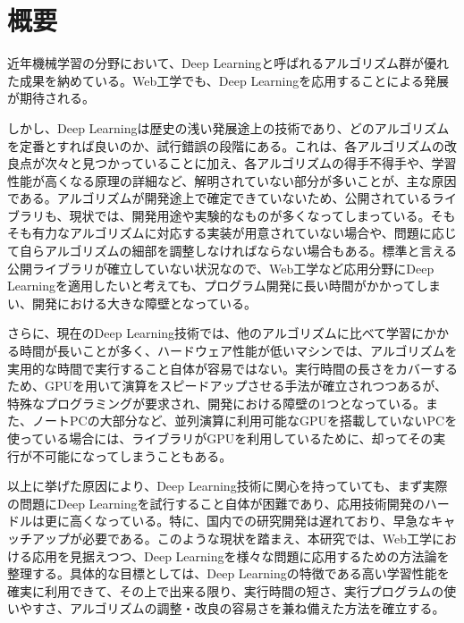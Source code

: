 \chapter*{概要}
近年機械学習の分野において、Deep Learningと呼ばれるアルゴリズム群が優れた成果を納めている。Web工学でも、Deep Learningを応用することによる発展が期待される。\par
しかし、Deep Learningは歴史の浅い発展途上の技術であり、どのアルゴリズムを定番とすれば良いのか、試行錯誤の段階にある。これは、各アルゴリズムの改良点が次々と見つかっていることに加え、各アルゴリズムの得手不得手や、学習性能が高くなる原理の詳細など、解明されていない部分が多いことが、主な原因である。アルゴリズムが開発途上で確定できていないため、公開されているライブラリも、現状では、開発用途や実験的なものが多くなってしまっている。そもそも有力なアルゴリズムに対応する実装が用意されていない場合や、問題に応じて自らアルゴリズムの細部を調整しなければならない場合もある。標準と言える公開ライブラリが確立していない状況なので、Web工学など応用分野にDeep Learningを適用したいと考えても、プログラム開発に長い時間がかかってしまい、開発における大きな障壁となっている。\par
さらに、現在のDeep Learning技術では、他のアルゴリズムに比べて学習にかかる時間が長いことが多く、ハードウェア性能が低いマシンでは、アルゴリズムを実用的な時間で実行すること自体が容易ではない。実行時間の長さをカバーするため、GPUを用いて演算をスピードアップさせる手法が確立されつつあるが、特殊なプログラミングが要求され、開発における障壁の1つとなっている。また、ノートPCの大部分など、並列演算に利用可能なGPUを搭載していないPCを使っている場合には、ライブラリがGPUを利用しているために、却ってその実行が不可能になってしまうこともある。\par
以上に挙げた原因により、Deep Learning技術に関心を持っていても、まず実際の問題にDeep Learningを試行すること自体が困難であり、応用技術開発のハードルは更に高くなっている。特に、国内での研究開発は遅れており、早急なキャッチアップが必要である。このような現状を踏まえ、本研究では、Web工学における応用を見据えつつ、Deep Learningを様々な問題に応用するための方法論を整理する。具体的な目標としては、Deep Learningの特徴である高い学習性能を確実に利用できて、その上で出来る限り、実行時間の短さ、実行プログラムの使いやすさ、アルゴリズムの調整・改良の容易さを兼ね備えた方法を確立する。